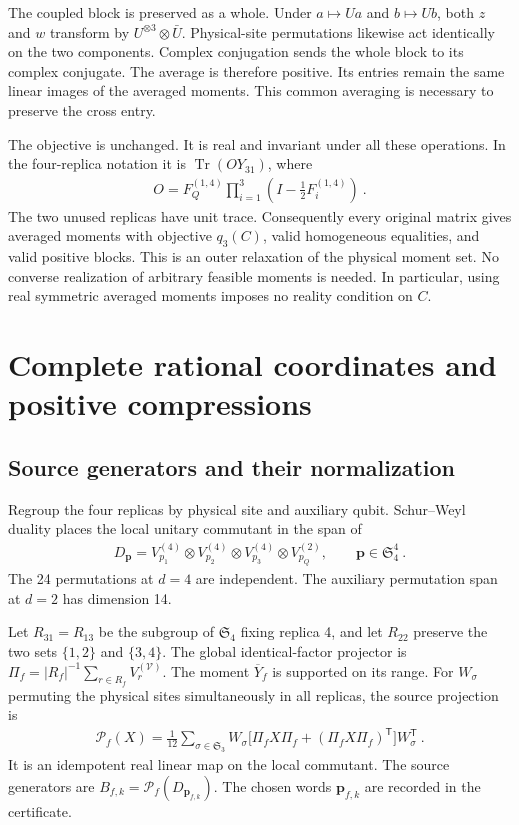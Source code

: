 \documentclass[aps,pra,reprint,superscriptaddress,amsmath,amssymb,floatfix,nofootinbib]{revtex4-2}
\newcommand{\Tr}{\operatorname{Tr}}
\newcommand{\Sfour}{\mathfrak S_4}
\newcommand{\Sthree}{\mathfrak S_3}
\begin{document}
The coupled block is preserved as a whole. Under $a\mapsto Ua$ and
$b\mapsto Ub$, both $z$ and $w$ transform by
$U^{\otimes3}\otimes\bar U$. Physical-site permutations likewise act
identically on the two components. Complex conjugation sends the whole
block to its complex conjugate. The average is therefore positive.
Its entries remain the same linear images of the averaged moments.
This common averaging is necessary to preserve the cross entry.

The objective is unchanged. It is real and invariant under all these
operations. In the four-replica notation it is
$\Tr(OY_{31})$, where
\begin{align}
 O=F_Q^{(1,4)}\prod_{i=1}^3\left(I-\frac12F_i^{(1,4)}\right)\ .
 \label{eq:four-replica-objective}
\end{align}
The two unused replicas have unit trace.
Consequently every original matrix gives averaged moments with objective
$q_3(C)$, valid homogeneous equalities, and valid positive blocks.
This is an outer relaxation of the physical moment set.
No converse realization of arbitrary feasible moments is needed.
In particular, using real symmetric averaged moments imposes no reality
condition on $C$.

\section{Complete rational coordinates and positive compressions}
\label{sec:coordinates}

\subsection{Source generators and their normalization}

Regroup the four replicas by physical site and auxiliary qubit.
Schur--Weyl duality places the local unitary commutant in the span of
\begin{align}
 D_{\boldsymbol p}
 =V_{p_1}^{(4)}\otimes V_{p_2}^{(4)}\otimes V_{p_3}^{(4)}
                         \otimes V_{p_Q}^{(2)},
 \qquad \boldsymbol p\in\Sfour^4\ .
 \label{eq:diagrams}
\end{align}
The 24 permutations at $d=4$ are independent.
The auxiliary permutation span at $d=2$ has dimension 14.

Let $R_{31}=R_{13}$ be the subgroup of $\Sfour$ fixing replica 4,
and let $R_{22}$ preserve the two sets $\{1,2\}$ and $\{3,4\}$.
The global identical-factor projector is
$\Pi_f=|R_f|^{-1}\sum_{r\in R_f}V_r^{(\mathcal V)}$.
The moment $\overline Y_f$ is supported on its range.
For $W_\sigma$ permuting the physical sites simultaneously in all replicas,
the source projection is
\begin{align}
 \mathcal P_f(X)=\frac1{12}\sum_{\sigma\in\Sthree}
 W_\sigma\bigl[\Pi_fX\Pi_f+(\Pi_fX\Pi_f)^{\mathsf T}\bigr]
 W_\sigma^{\mathsf T}\ .
 \label{eq:source-projection}
\end{align}
It is an idempotent real linear map on the local commutant.
The source generators are $B_{f,k}=\mathcal P_f(D_{\boldsymbol p_{f,k}})$.
The chosen words $\boldsymbol p_{f,k}$ are recorded in the certificate.
\end{document}
